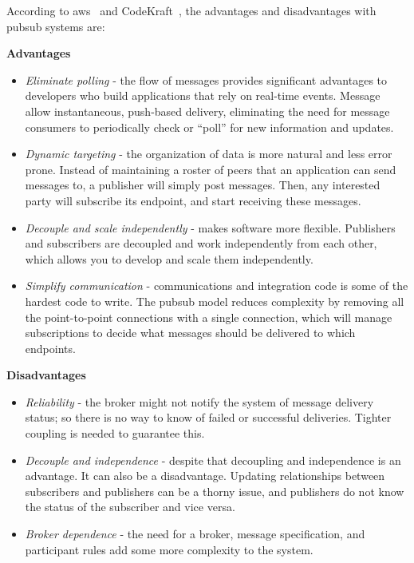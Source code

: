 According to \ac{aws}~\cite{aws_benefit} and CodeKraft~\cite{pubsub_codekraft}, the advantages and disadvantages with \ac{pubsub} systems are:

\textbf{Advantages}
\begin{itemize}
    \item \emph{Eliminate polling} - the flow of messages provides significant advantages to developers who build applications that rely on real-time events. Message allow instantaneous, push-based delivery, eliminating the need for message consumers to periodically check or “poll” for new information and updates.
    
    \item \emph{Dynamic targeting} - the organization of data is more natural and less error prone. Instead of maintaining a roster of peers that an application can send messages to, a publisher will simply post messages. Then, any interested party will subscribe its endpoint, and start receiving these messages.
    
    \item \emph{Decouple and scale independently} - makes software more flexible. Publishers and subscribers are decoupled and work independently from each other, which allows you to develop and scale them independently.
    
    \item \emph{Simplify communication} - communications and integration code is some of the hardest code to write. The \ac{pubsub} model reduces complexity by removing all the point-to-point connections with a single connection, which will manage subscriptions to decide what messages should be delivered to which endpoints.
\end{itemize}

\textbf{Disadvantages}
\begin{itemize}
    \item \emph{Reliability} -  the broker might not notify the system of message delivery status; so there is no way to know of failed or successful deliveries. Tighter coupling is needed to guarantee this.
    
    \item \emph{Decouple and independence} - despite that decoupling and independence is an advantage. It can also be a disadvantage. Updating relationships between subscribers and publishers can be a thorny issue, and publishers do not know the status of the subscriber and vice versa.
    
    \item \emph{Broker dependence} - the need for a broker, message specification, and participant rules add some more complexity to the system.
\end{itemize}

